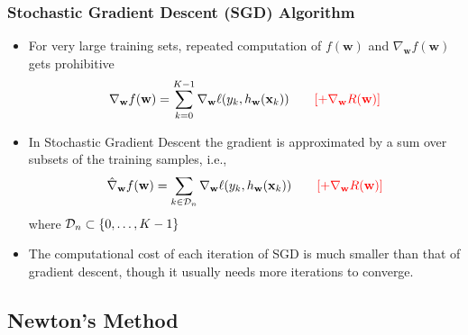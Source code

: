 \documentclass{beamer}
\newcommand{\xM}{{\mathbf x}}
\newcommand{\w}{{\mathbf w}}
\begin{document}
\begin{frame}

	\frametitle{Stochastic Gradient Descent (SGD) Algorithm}

\begin{itemize}
\item For very large training sets, repeated computation of $f(\w)$ and $\nabla_\w f(\w)$ gets prohibitive
$$\nabla_\w f(\w) = \sum_{k=0}^{K-1} \nabla_\w \ell(y_k, h_\w(\xM_k)) ~~~~~~ \color{red}{[+\nabla_\w R(\w)]}$$

\item In Stochastic Gradient Descent the gradient is approximated by a sum over subsets of the training samples, i.e.,
$$\hat \nabla_\w f(\w) = \sum_{k \in {\cal D}_n} \nabla_\w \ell(y_k, h_\w(\xM_k)) ~~~~~~ \color{red}{[+\nabla_\w R(\w)]}$$
where ${\cal D}_n \subset \left\{0,\dots,K-1 \right\}$

\item The computational cost of each iteration of SGD is much smaller than that of gradient descent, though it usually needs more iterations to converge.
\end{itemize}


\end{frame}

\subsection{Newton's Method}
\end{document}
